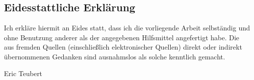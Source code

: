 \clearpage{\pagestyle{empty}\cleardoublepage}

\setcounter{tocdepth}{3}
\tableofcontents
\newpage
\listoffigures
\lstlistoflistings
\clearpage


\thispagestyle{empty}
\subsection*{Eidesstattliche Erklärung}
Ich erkläre hiermit an Eides statt, dass ich die vorliegende Arbeit
selbständig und ohne Benutzung anderer als der angegebenen Hilfsmittel
angefertigt habe. Die aus fremden Quellen (einschließlich elektronischer
Quellen) direkt oder indirekt übernommenen Gedanken sind ausnahmslos als
solche kenntlich gemacht.

\vspace{2cm}

\noindent Eric Teubert

\clearpage{\pagestyle{empty}\cleardoublepage}